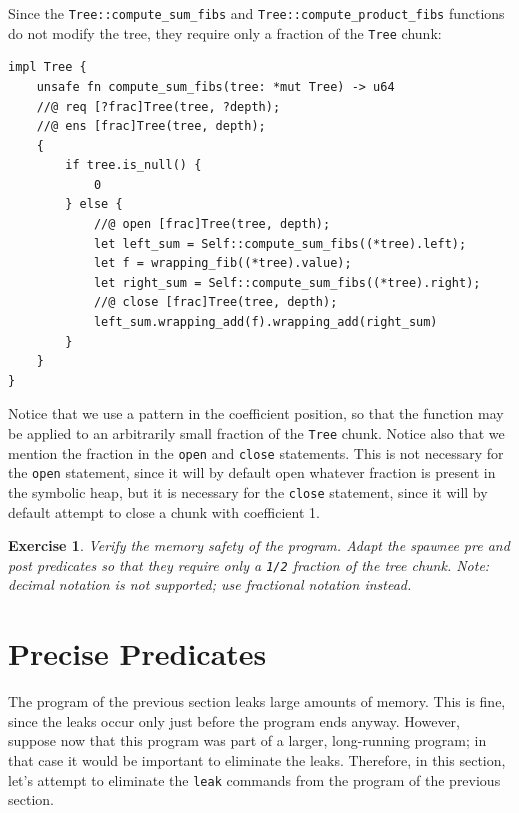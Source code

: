 \documentclass{article}
\newtheorem{exercise}{Exercise}
\begin{document}
Since the \lstinline!Tree::compute_sum_fibs! and \lstinline|Tree::compute_product_fibs| functions do not modify the
tree, they require only a fraction of the \lstinline!Tree!
chunk:
\begin{lstlisting}
impl Tree {
    unsafe fn compute_sum_fibs(tree: *mut Tree) -> u64
    //@ req [?frac]Tree(tree, ?depth);
    //@ ens [frac]Tree(tree, depth);
    {
        if tree.is_null() {
            0
        } else {
            //@ open [frac]Tree(tree, depth);
            let left_sum = Self::compute_sum_fibs((*tree).left);
            let f = wrapping_fib((*tree).value);
            let right_sum = Self::compute_sum_fibs((*tree).right);
            //@ close [frac]Tree(tree, depth);
            left_sum.wrapping_add(f).wrapping_add(right_sum)
        }
    }
}
\end{lstlisting}
Notice that we use a pattern in the coefficient position, so
that the function may be applied to an arbitrarily small
fraction of the \lstinline!Tree! chunk. Notice also that we
mention the fraction in the \lstinline!open! and
\lstinline!close! statements. This is not necessary for the
\lstinline!open! statement, since it will by default open
whatever fraction is present in the symbolic heap, but it is
necessary for the \lstinline!close! statement, since it will by
default attempt to close a chunk with coefficient 1.

\begin{exercise}\label{exercise:fractions}
Verify the memory safety of the program. Adapt the spawnee pre
and post predicates so that they require only a
\lstinline!1/2! fraction of the tree chunk. Note: decimal
notation is not supported; use fractional notation instead.
\end{exercise}

\section{Precise Predicates}\label{section:precise}

The program of the previous section leaks large amounts of
memory. This is fine, since the leaks occur only just before
the program ends anyway. However, suppose now that this program
was part of a larger, long-running program; in that case it
would be important to eliminate the leaks. Therefore, in this
section, let's attempt to eliminate the \lstinline|leak|
commands from the program of the previous section.
\end{document}
